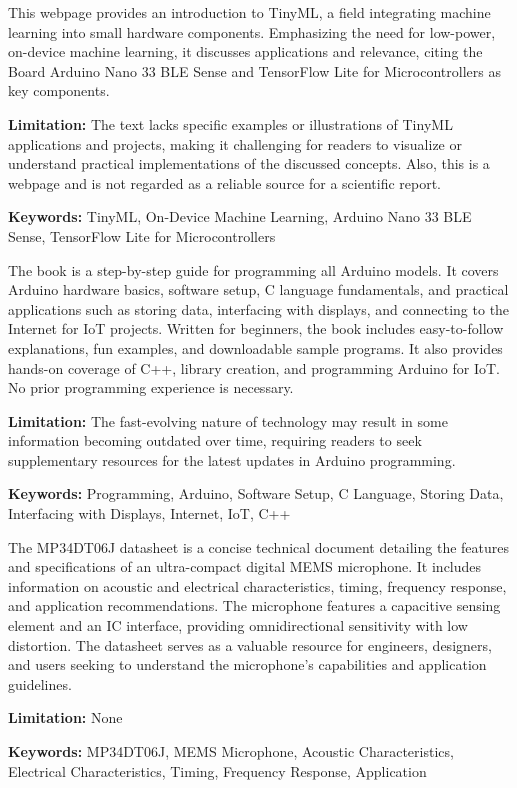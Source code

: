 { 
	This webpage \cite{Mishra:2023} provides an introduction to TinyML, a field integrating machine learning into small hardware components. Emphasizing the need for low-power, on-device machine learning, it discusses applications and relevance, citing the Board Arduino Nano 33 BLE Sense and TensorFlow Lite for Microcontrollers as key components.
	
	\bigskip
	
	\textbf{Limitation:} The text lacks specific examples or illustrations of TinyML applications and projects, making it challenging for readers to visualize or understand practical implementations of the discussed concepts. Also, this is a webpage and is not regarded as a reliable source for a scientific report.
	
	\scriptsize{\textbf{Keywords:} TinyML, On-Device Machine Learning, Arduino Nano 33 BLE Sense, TensorFlow Lite for Microcontrollers}
}


{ 
	
	The book \cite{Monk:2016} is a step-by-step guide for programming all Arduino models. It covers Arduino hardware basics, software setup, C language fundamentals, and practical applications such as storing data, interfacing with displays, and connecting to the Internet for IoT projects. Written for beginners, the book includes easy-to-follow explanations, fun examples, and downloadable sample programs. It also provides hands-on coverage of C++, library creation, and programming Arduino for IoT. No prior programming experience is necessary.
	
	\bigskip
	
	\textbf{Limitation:} The fast-evolving nature of technology may result in some information becoming outdated over time, requiring readers to seek supplementary resources for the latest updates in Arduino programming.
	
	\scriptsize{\textbf{Keywords:} Programming, Arduino, Software Setup, C Language, Storing Data, Interfacing with Displays, Internet, IoT, C++}
}


{ 
	
	The MP34DT06J datasheet \cite{MP34DT06J:2021} is a concise technical document detailing the features and specifications of an ultra-compact digital MEMS microphone. It includes information on acoustic and electrical characteristics, timing, frequency response, and application recommendations. The microphone features a capacitive sensing element and an IC interface, providing omnidirectional sensitivity with low distortion. The datasheet serves as a valuable resource for engineers, designers, and users seeking to understand the microphone's capabilities and application guidelines.
	
	\bigskip
	
	\textbf{Limitation:} None
	
	\scriptsize{\textbf{Keywords:} MP34DT06J, MEMS Microphone, Acoustic Characteristics, Electrical Characteristics, Timing, Frequency Response, Application}
}


